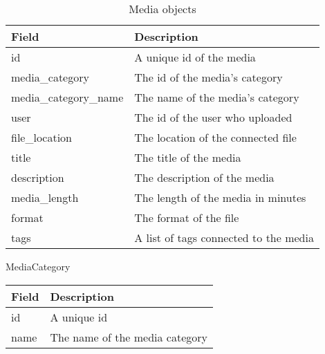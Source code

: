\documentclass[11pt]{article}
\begin{document}
\begin{table}[H]
\caption{Media objects}
\begin{center}
\begin{tabular}{|l|l|}
\hline
 Field                                          &  Description                            \\
\hline
 id                                             &  A unique id of the media               \\
 media\_category                    &  The id of the media's category         \\
 media\_category\_name  &  The name of the media's category       \\
 user                                           &  The id of the user who uploaded        \\
 file\_location                     &  The location of the connected file     \\
 title                                          &  The title of the media                 \\
 description                                    &  The description of the media           \\
 media\_length                      &  The length of the media in minutes     \\
 format                                         &  The format of the file                 \\
 tags                                           &  A list of tags connected to the media  \\
\hline
\end{tabular}
\end{center}
\end{table}


MediaCategory

\begin{center}
\begin{tabular}{|l|l|}
\hline
 Field  &  Description                     \\
\hline
 id     &  A unique id                     \\
 name   &  The name of the media category  \\
\hline
\end{tabular}
\end{center}
\end{document}

